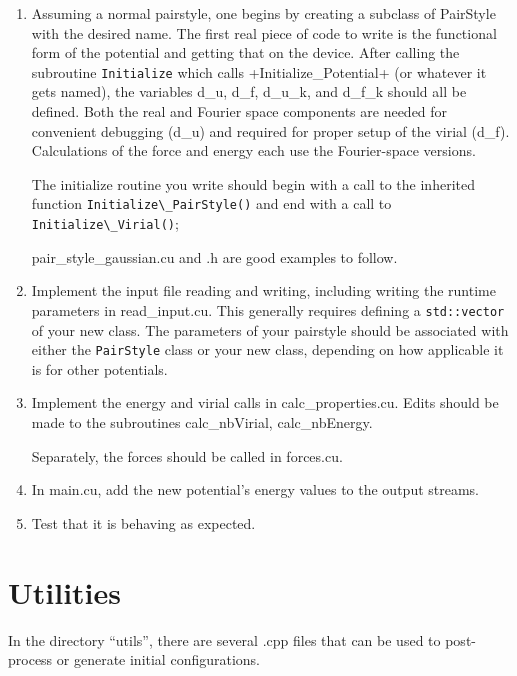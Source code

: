 \documentclass[12pt]{article}
\begin{document}
\begin{enumerate}
	\item
	Assuming a normal pairstyle, one begins by creating a subclass of PairStyle with the desired name. The first real piece of code to write is the functional form of the potential and getting that on the device. After calling the subroutine \verb+Initialize+ which calls +Initialize\_Potential+ (or whatever it gets named), the variables d\_u, d\_f, d\_u\_k, and d\_f\_k should all be defined. Both the real and Fourier space components are needed for convenient debugging (d\_u) and required for proper setup of the virial (d\_f). Calculations of the force and energy each use the Fourier-space versions.
	
	The initialize routine you write should begin with a call to the inherited function \verb+Initialize\_PairStyle()+ and end with a call to \verb+Initialize\_Virial()+;
	
	pair\_style\_gaussian.cu and .h are good examples to follow.
	
	\item
	Implement the input file reading and writing, including writing the runtime parameters in read\_input.cu. This generally requires defining a \verb+std::vector+ of your new class. The parameters of your pairstyle should be associated with either the \verb+PairStyle+ class or your new class, depending on how applicable it is for other potentials. 
	
	\item
	Implement the energy and virial calls in calc\_properties.cu. Edits should be made to the subroutines calc\_nbVirial, calc\_nbEnergy.
	
	Separately, the forces should be called in forces.cu.
	
	\item
	In main.cu, add the new potential's energy values to the output streams.
	
	\item
	Test that it is behaving as expected.
	
\end{enumerate}




\pagebreak
\section{Utilities}

In the directory ``utils'', there are several .cpp files that can be used to post-process or generate initial configurations. 
\end{document}
